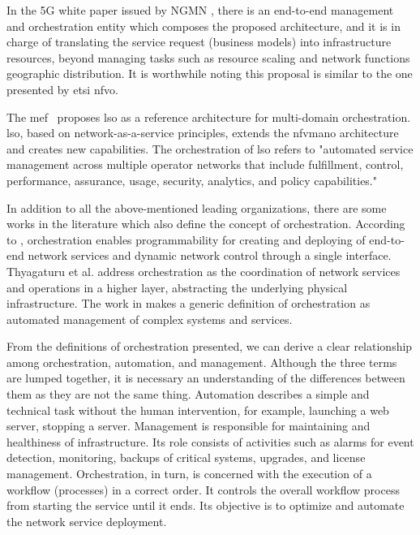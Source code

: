In the 5G white paper issued by NGMN \cite{NGMNAlliance2015NGMNPaper}, there is an end-to-end management and orchestration entity which composes the proposed architecture, and it is in charge of translating the service request (business models) into infrastructure resources, beyond managing tasks such as resource scaling and network functions geographic distribution. It is worthwhile noting this proposal is similar to the one presented by \gls{etsi} \gls{nfvo}.  

The \gls{mef}~\cite{MEF:Third:2015} proposes \gls{lso} as a reference architecture for multi-domain orchestration. \gls{lso}, based on network-as-a-service principles, extends the \gls{nfvmano} architecture and creates new capabilities. The orchestration of \gls{lso} refers to "automated service management across multiple operator networks that include fulfillment, control, performance, assurance, usage, security, analytics, and policy capabilities."

In addition to all the above-mentioned leading organizations, there are some works in the literature which also define the concept of orchestration. According to \cite{Rostami2016Multi-Domain5G}, orchestration enables programmability for creating and deploying of end-to-end network services and dynamic network control through a single interface. Thyagaturu et al. \cite{Thyagaturu2016SoftwareSurvey} address orchestration as the coordination of network services and operations in a higher layer, abstracting the underlying physical infrastructure. The work in \cite{Guerzoni2016Multi-domainApproach} makes a generic definition of orchestration as automated management of complex systems and services.

From the definitions of orchestration presented, we can derive a clear relationship among orchestration, automation, and management. Although the three terms are lumped together, it is necessary an understanding  of the differences between them as they are not the same thing. 
Automation describes a simple and technical task without the human intervention, for example, launching a web server, stopping a server. 
Management is responsible for maintaining and healthiness of infrastructure. Its role consists of activities such as alarms for event detection, monitoring, backups of critical systems, upgrades, and license management. 
Orchestration, in turn, is concerned with the execution of a workflow (processes) in a correct order. It controls the overall workflow process from starting the service until it ends. Its objective is to optimize and automate the network service deployment. 


